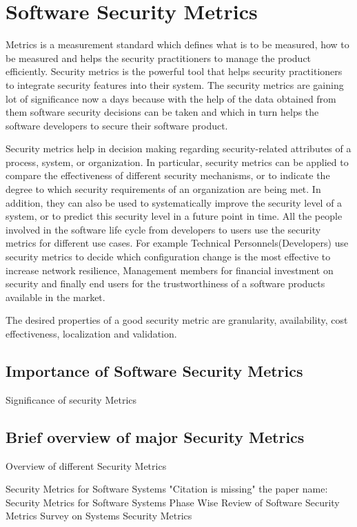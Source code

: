 \documentclass[pdftex,english,oribibl]{llncs}
\begin{document}
\section{Software Security Metrics}
Metrics is a measurement standard which defines what is to be measured, how to be measured and helps the security practitioners to manage the product efficiently. Security metrics is the powerful tool that helps security practitioners to integrate security features into their system. The security metrics are gaining lot of significance now a days because with the help of the data obtained from them software security decisions can be taken and which in turn helps the software developers to secure their software product. 

Security metrics help in decision making regarding security-related attributes of a process, system, or organization. In particular, security metrics can be applied to compare the effectiveness of different security mechanisms, or to indicate the degree to which security requirements of an organization are being met. In addition, they can also be used to systematically improve the security level of a system, or to predict this security level in a future point in time. All the people involved in the software life cycle from developers to users use the security metrics for different use cases. For example Technical Personnels(Developers) use security metrics to decide which configuration change is the most effective to increase network resilience, Management members for financial investment on security and finally end users for the trustworthiness of a software products available in the market.

The desired properties of a good security metric are granularity, availability, cost effectiveness, localization and validation\cite{8017389}. 

\subsection{Importance of Software Security Metrics}
Significance of security Metrics
\subsection{Brief overview of major Security Metrics}
Overview of different  Security Metrics\newline

	Security Metrics for Software Systems\cite{Wang:2009:SMS:1566445.1566509}\newline
	"Citation is missing" the paper name: Security Metrics for Software Systems\newline
	Phase Wise Review of Software Security Metrics\cite{Ansar:PWRSSM}\newline
	Survey on Systems Security Metrics\cite{Pendleton:2016:SSS:3022634.3005714}\newline
	
\end{document}
